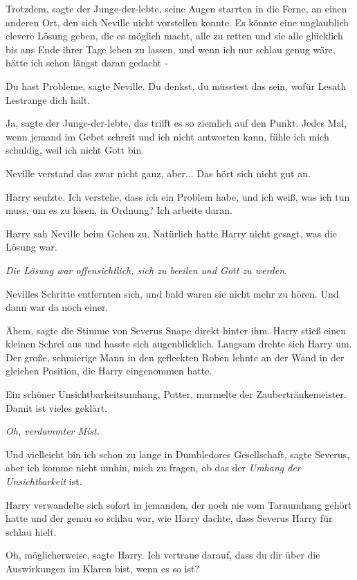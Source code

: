 \glqq Trotzdem\grqq{}, sagte der Junge-der-lebte, seine Augen starrten in die
Ferne, an einen anderen Ort, den sich Neville nicht vorstellen konnte. \glqq Es
könnte eine unglaublich clevere Lösung geben, die es möglich macht, alle zu
retten und sie alle glücklich bis ans Ende ihrer Tage leben zu lassen, und wenn
ich nur schlau genug wäre, hätte ich schon längst daran gedacht -\grqq{}

\glqq Du hast Probleme\grqq{}, sagte Neville. \glqq Du denkst, du müsstest das
sein, wofür Lesath Lestrange dich hält.\grqq{}

\glqq Ja\grqq{}, sagte der Junge-der-lebte, \glqq das trifft es so ziemlich auf
den Punkt. Jedes Mal, wenn jemand im Gebet schreit und ich nicht antworten kann,
fühle ich mich schuldig, weil ich nicht Gott bin.\grqq{}

Neville verstand das zwar nicht ganz, aber... \glqq Das hört sich nicht gut
an.\grqq{}

Harry seufzte. \glqq Ich verstehe, dass ich ein Problem habe, und ich weiß, was
ich tun muss, um es zu lösen, in Ordnung? Ich arbeite daran.\grqq{}

Harry sah Neville beim Gehen zu. Natürlich hatte Harry nicht gesagt, was die
Lösung war.

\emph{Die Lösung war offensichtlich, sich zu beeilen und Gott zu werden}.

Nevilles Schritte entfernten sich, und bald waren sie nicht mehr zu hören. Und
dann war da noch einer.

\glqq Ähem\grqq{}, sagte die Stimme von Severus Snape direkt hinter ihm. Harry
stieß einen kleinen Schrei aus und hasste sich augenblicklich. Langsam drehte
sich Harry um. Der große, schmierige Mann in den gefleckten Roben lehnte an der
Wand in der gleichen Position, die Harry eingenommen hatte.

\glqq Ein schöner Unsichtbarkeitsumhang, Potter\grqq{}, murmelte der
Zaubertränkemeister. \glqq Damit ist vieles geklärt.\grqq{}

\emph{Oh, verdammter Mist.}

\glqq Und vielleicht bin ich schon zu lange in Dumbledores Gesellschaft\grqq{},
sagte Severus, \glqq aber ich komme nicht umhin, mich zu fragen, ob das der
\emph{Umhang der Unsichtbarkeit} ist.\grqq{}

Harry verwandelte sich sofort in jemanden, der noch nie vom Tarnumhang gehört
hatte und der genau so schlau war, wie Harry dachte, dass Severus Harry für
schlau hielt.

\glqq Oh, möglicherweise\grqq{}, sagte Harry. \glqq Ich vertraue darauf, dass du
dir über die Auswirkungen im Klaren bist, wenn es so ist?\grqq{}

